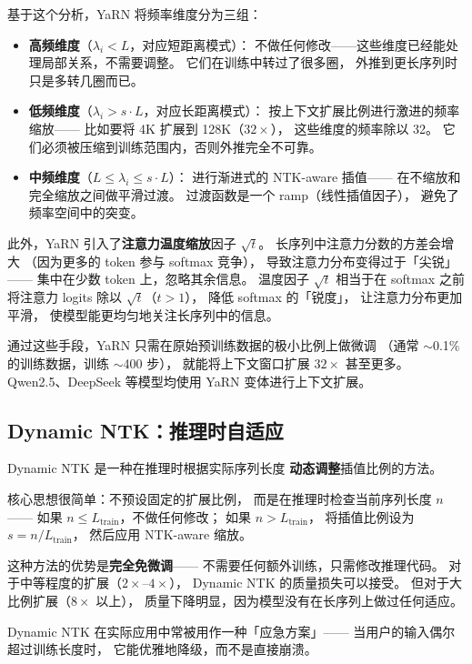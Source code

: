 基于这个分析，YaRN 将频率维度分为三组：
\begin{itemize}[noitemsep]
  \item \textbf{高频维度}（$\lambda_i < L$，对应短距离模式）：
        不做任何修改——这些维度已经能处理局部关系，不需要调整。
        它们在训练中转过了很多圈，
        外推到更长序列时只是多转几圈而已。
  \item \textbf{低频维度}（$\lambda_i > s \cdot L$，对应长距离模式）：
        按上下文扩展比例进行激进的频率缩放——
        比如要将 4K 扩展到 128K（$32\times$），
        这些维度的频率除以 32。
        它们必须被压缩到训练范围内，否则外推完全不可靠。
  \item \textbf{中频维度}（$L \leq \lambda_i \leq s \cdot L$）：
        进行渐进式的 NTK-aware 插值——
        在不缩放和完全缩放之间做平滑过渡。
        过渡函数是一个 ramp（线性插值因子），
        避免了频率空间中的突变。
\end{itemize}

此外，YaRN 引入了\textbf{注意力温度缩放}因子 $\sqrt{t}$。
长序列中注意力分数的方差会增大
（因为更多的 token 参与 softmax 竞争），
导致注意力分布变得过于「尖锐」——
集中在少数 token 上，忽略其余信息。
温度因子 $\sqrt{t}$ 相当于在 softmax 之前
将注意力 logits 除以 $\sqrt{t}$（$t > 1$），
降低 softmax 的「锐度」，
让注意力分布更加平滑，
使模型能更均匀地关注长序列中的信息。

通过这些手段，YaRN 只需在原始预训练数据的极小比例上做微调
（通常 $\sim$0.1\% 的训练数据，训练 $\sim$400 步），
就能将上下文窗口扩展 $32\times$ 甚至更多。
Qwen2.5、DeepSeek 等模型均使用 YaRN 变体进行上下文扩展。

\subsection{Dynamic NTK：推理时自适应}

Dynamic NTK 是一种在推理时根据实际序列长度
\textbf{动态调整}插值比例的方法。

核心思想很简单：不预设固定的扩展比例，
而是在推理时检查当前序列长度 $n$——
如果 $n \leq L_{\text{train}}$，不做任何修改；
如果 $n > L_{\text{train}}$，
将插值比例设为 $s = n / L_{\text{train}}$，
然后应用 NTK-aware 缩放。

这种方法的优势是\textbf{完全免微调}——
不需要任何额外训练，只需修改推理代码。
对于中等程度的扩展（$2\times$--$4\times$），
Dynamic NTK 的质量损失可以接受。
但对于大比例扩展（$8\times$ 以上），
质量下降明显，因为模型没有在长序列上做过任何适应。

Dynamic NTK 在实际应用中常被用作一种「应急方案」——
当用户的输入偶尔超过训练长度时，
它能优雅地降级，而不是直接崩溃。

